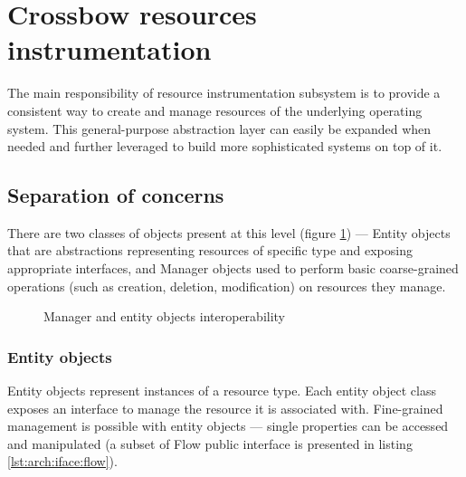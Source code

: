 \documentclass[11pt,openany]{book}
\begin{document}
    \section{Crossbow resources instrumentation}
    \label{sec:arch:inst}

      The main responsibility of resource instrumentation subsystem is to provide a consistent way to create and manage
      resources of the underlying operating system. This general-purpose abstraction layer can easily be expanded when
      needed and further leveraged to build more sophisticated systems on top of it.


      \subsection{Separation of concerns}

        There are two classes of objects present at this level (figure \ref{fig:arch:manent}) --- Entity objects that
        are abstractions representing resources of specific type and exposing appropriate interfaces, and Manager
        objects used to perform basic coarse-grained operations (such as creation, deletion, modification) on resources
        they manage.

        \begin{figure}[H]
          \begin{center}
          \end{center}

          \caption{Manager and entity objects interoperability}
          \label{fig:arch:manent}
        \end{figure}


        \subsubsection{Entity objects}

          Entity objects represent instances of a resource type. Each entity object class exposes an interface to manage
          the resource it is associated with. Fine-grained management is possible with entity objects --- single
          properties can be accessed and manipulated (a subset of Flow public interface is presented in listing
          \ref{lst:arch:iface:flow}). \\
\end{document}
